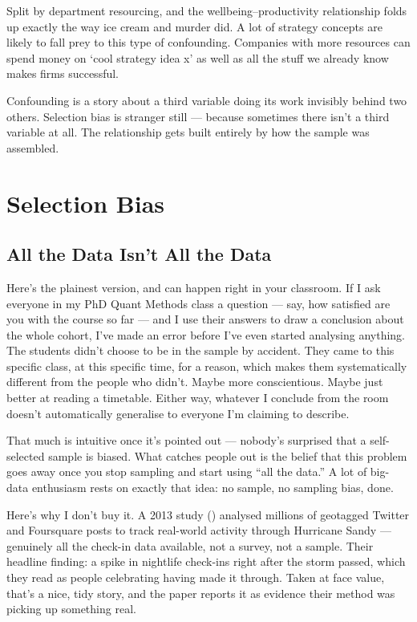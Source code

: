 \documentclass[
]{book}
\begin{document}
Split by department resourcing, and the wellbeing--productivity relationship folds up exactly the way ice cream and murder did. A lot of strategy concepts are likely to fall prey to this type of confounding. Companies with more resources can spend money on `cool strategy idea x' as well as all the stuff we already know makes firms successful.

Confounding is a story about a third variable doing its work invisibly behind two others. Selection bias is stranger still --- because sometimes there isn't a third variable at all. The relationship gets built entirely by how the sample was assembled.

\section{Selection Bias}\label{selection-bias}

\subsection{All the Data Isn't All the Data}\label{all-the-data-isnt-all-the-data}

Here's the plainest version, and can happen right in your classroom. If I ask everyone in my PhD Quant Methods class a question --- say, how satisfied are you with the course so far --- and I use their answers to draw a conclusion about the whole cohort, I've made an error before I've even started analysing anything. The students didn't choose to be in the sample by accident. They came to this specific class, at this specific time, for a reason, which makes them systematically different from the people who didn't. Maybe more conscientious. Maybe just better at reading a timetable. Either way, whatever I conclude from the room doesn't automatically generalise to everyone I'm claiming to describe.

That much is intuitive once it's pointed out --- nobody's surprised that a self-selected sample is biased. What catches people out is the belief that this problem goes away once you stop sampling and start using ``all the data.'' A lot of big-data enthusiasm rests on exactly that idea: no sample, no sampling bias, done.

Here's why I don't buy it. A 2013 study () analysed millions of geotagged Twitter and Foursquare posts to track real-world activity through Hurricane Sandy --- genuinely all the check-in data available, not a survey, not a sample. Their headline finding: a spike in nightlife check-ins right after the storm passed, which they read as people celebrating having made it through. Taken at face value, that's a nice, tidy story, and the paper reports it as evidence their method was picking up something real.
\end{document}
